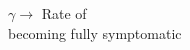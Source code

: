 \documentclass[preview]{standalone}
\begin{document}
\begin{center}
$\gamma \rightarrow$ Rate of\\becoming fully symptomatic
\end{center}
\end{document}
